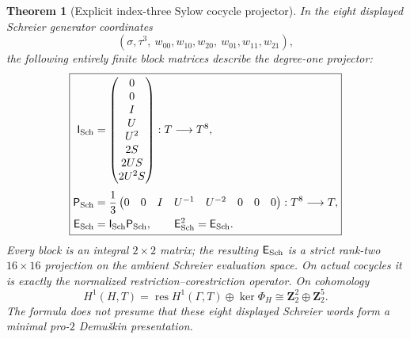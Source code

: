 \documentclass[11pt]{article}
\newtheorem{theorem}{Theorem}[section]
\theoremstyle{definition}
\begin{document}
\begin{theorem}[Explicit index-three Sylow cocycle projector]
In the eight displayed
Schreier generator coordinates
\[
(\sigma,\tau^3,\
w_{00},w_{10},w_{20},\
w_{01},w_{11},w_{21}),
\]
the following \emph{entirely
finite} block matrices describe
the degree-one projector:
\begin{equation}\label{eq:dyadic-s3-schreier-16x16-projector}
\boxed{
\begin{aligned}
\mathsf I_{\rm Sch}&=
\begin{pmatrix}
0\\0\\I\\U\\U^2\\2S\\2US\\2U^2S
\end{pmatrix}:T\longrightarrow T^8,\\[3pt]
\mathsf P_{\rm Sch}&=\frac13
\begin{pmatrix}
0&0&I&U^{-1}&U^{-2}&0&0&0
\end{pmatrix}:T^8\longrightarrow T,\\
\mathsf E_{\rm Sch}
&=\mathsf I_{\rm Sch}\mathsf P_{\rm Sch},
\qquad
\mathsf E_{\rm Sch}^2=\mathsf E_{\rm Sch}.
\end{aligned}}
\end{equation}
Every block is an integral
$2\times2$ matrix; the resulting
$\mathsf E_{\rm Sch}$ is a
strict rank-two $16\times16$
projection on the ambient
Schreier evaluation space.
On actual cocycles it is
\emph{exactly} the normalized
restriction--corestriction
operator.  On cohomology
\begin{equation}\label{eq:dyadic-s3-h1-primitive-decomposition}
\boxed{\quad
H^1(H,T)
=\operatorname{res}H^1(\Gamma,T)
\oplus\ker\Phi_H
\cong\mathbf Z_2^2
\oplus\mathbf Z_2^5.
\quad}
\end{equation}
The formula does not presume
that these eight displayed
Schreier words form a
\emph{minimal} pro-$2$
Demu\v{s}kin presentation.
\end{theorem}
\end{document}
